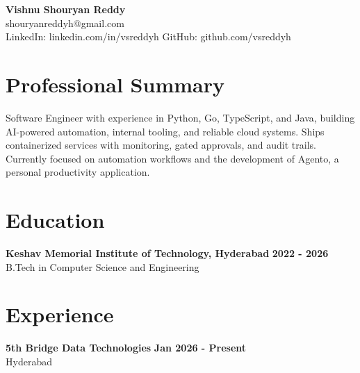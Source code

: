 \documentclass[a4paper,11pt]{article}
\newcommand{\resumeSubheading}[4]{%
  \textbf{#1} \hfill \textbf{#2} \\
{#3} \hfill {#4}
}
\begin{document}
\pagestyle{empty}
\raggedbottom
\addtolength{\textheight}{2\baselineskip}
\small

\begin{center}
  {\LARGE \textbf{Vishnu Shouryan Reddy}}\\[0.3em]
  shouryanreddyh@gmail.com \\[0.3em]
  LinkedIn: linkedin.com/in/vsreddyh \textbar{} GitHub: github.com/vsreddyh
\end{center}
\vspace{-0.8em}

\section*{Professional Summary}

Software Engineer with experience in Python, Go, TypeScript, and Java, building AI-powered automation, internal tooling, and reliable cloud systems. Ships containerized services with monitoring, gated approvals, and audit trails. Currently focused on automation workflows and the development of Agento, a personal productivity application.

\section*{Education}

\resumeSubheading
{Keshav Memorial Institute of Technology, Hyderabad}{2022 - 2026}
{B.Tech in Computer Science and Engineering}{}


\section*{Experience}

\resumeSubheading
{5th Bridge Data Technologies}{Jan 2026 - Present}
{Hyderabad}{}
\end{document}
